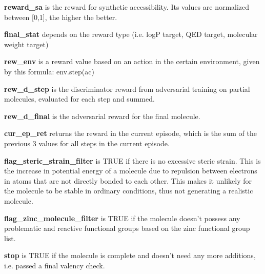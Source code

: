 \documentclass{article}
\begin{document}
\textbf{reward\_sa} is the reward for synthetic accessibility. Its values are normalized between [0,1], the higher the better.

\textbf{final\_stat} depends on the reward type (i.e. logP target, QED target, molecular weight target)

\textbf{rew\_env} is a reward value based on an action in the certain environment, given by this formula: env.step(ac)

\textbf{rew\_d\_step} is the discriminator reward from adversarial training on partial molecules, evaluated for each step and summed.

\textbf{rew\_d\_final} is the adversarial reward for the final molecule.

\textbf{cur\_ep\_ret} returns the reward in the current episode, which is the sum of the previous 3 values for all steps in the current episode.

\textbf{flag\_steric\_strain\_filter} is TRUE if there is no excessive steric strain. This is the increase in potential energy of a molecule due to repulsion between electrons in atoms that are not directly bonded to each other. This makes it unlikely for the molecule to be stable in ordinary conditions, thus not generating a realistic molecule.

\textbf{flag\_zinc\_molecule\_filter} is TRUE if the molecule doesn’t possess any problematic and reactive functional groups based on the zinc functional group list.

\textbf{stop} is TRUE if the molecule is complete and doesn’t need any more additions, i.e. passed a final valency check.
\end{document}

